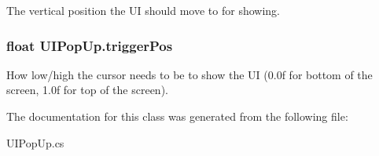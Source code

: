 The vertical position the UI should move to for showing. 

\subsubsection[{trigger\+Pos}]{\setlength{\rightskip}{0pt plus 5cm}float U\+I\+Pop\+Up.\+trigger\+Pos}\label{class_u_i_pop_up_adfe9128f5953b521ac2730d8092eb66d}


How low/high the cursor needs to be to show the UI (0.\+0f for bottom of the screen, 1.\+0f for top of the screen). 



The documentation for this class was generated from the following file\+:\begin{DoxyCompactItemize}
\item 
U\+I\+Pop\+Up.\+cs\end{DoxyCompactItemize}
